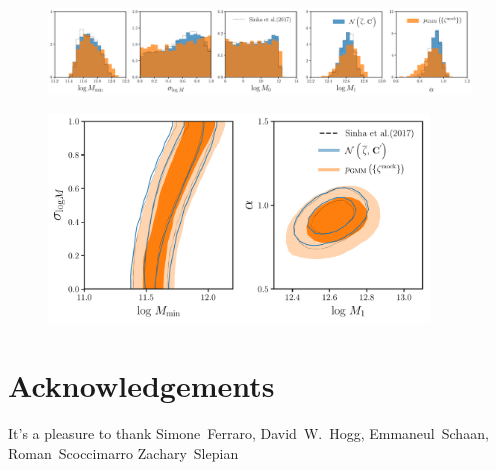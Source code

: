 \documentclass[12pt, letterpaper, preprint]{aastex}
\begin{document}
\begin{figure}
\begin{center}
\includegraphics[width=\textwidth]{figs/Like_GMF_comparison.pdf}
\caption{}
\label{fig:gmf_like}
\end{center}
\end{figure}

\begin{figure}
\begin{center}
\includegraphics[width=0.9\textwidth]{figs/GMFcontours_manodeep.pdf}
\caption{}
\label{fig:gmf_contour}
\end{center}
\end{figure}

\section*{Acknowledgements}
It's a pleasure to thank 
    Simone~Ferraro,
    David~W.~Hogg,
    Emmaneul~Schaan, 
    Roman~Scoccimarro
    Zachary~Slepian



\end{document}
